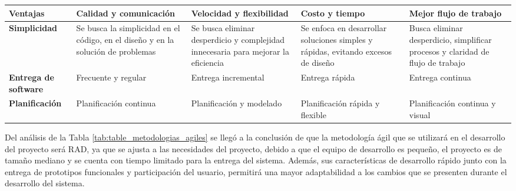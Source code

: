 \begin{spacing}{1}
\begin{center}
\begin{longtable}[l]{ |>{\bfseries}p{}| p{} |p{}  |p{} | p{}|}
            \hline
            Ventajas & Calidad y comunicación & Velocidad y flexibilidad & Costo y tiempo & Mejor flujo de trabajo \\
            \hline
            Simplicidad                            & Se busca la simplicidad en el código, en el diseño y en la solución de problemas & Se busca eliminar desperdicio y complejidad innecesaria para mejorar la eficiencia & Se enfoca en desarrollar soluciones simples y rápidas, evitando excesos de diseño & Busca eliminar desperdicio, simplificar procesos y claridad de flujo de trabajo \\
            \hline
            Entrega de software                    & Frecuente y regular                                                                                    & Entrega incremental                                                                            & Entrega rápida                                                                             & Entrega continua                                                                        \\
            \hline
            Planificación                          & Planificación continua                                                                                 & Planificación y modelado                                                                       & Planificación rápida y flexible & Planificación continua y visual \\
            \hline
        \end{longtable}

    \end{center}
\end{spacing}

Del análisis de la Tabla \ref{tab:table_metodologias_agiles} se llegó a la conclusión de que la metodología ágil que se utilizará en el desarrollo del proyecto será RAD, ya que se ajusta a las necesidades del proyecto, debido a que el equipo de desarrollo es pequeño, el proyecto es de tamaño mediano y se cuenta con tiempo limitado para la entrega del sistema.
Además, sus características de desarrollo rápido junto con la entrega de prototipos funcionales y participación del usuario, permitirá una mayor adaptabilidad a los cambios que se presenten durante el desarrollo del sistema.
